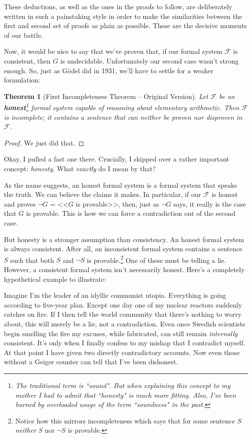 \documentclass{article}
\theoremstyle{theorem}
\newtheorem{theorem}{Theorem}
\begin{document}
These deductions, as well as the ones in the proofs to follow, are deliberately written in such a painstaking style in order to make the similarities between the first and second set of proofs as plain as possible. These are the decisive moments of our battle.

Now, it would be nice to say that we've proven that, if our formal system $\mathcal{F}$ is consistent, then $G$ is undecidable. Unfortunately our second case wasn't strong enough. So, just as Gödel did in 1931, we'll have to settle for a weaker formulation:

\begin{theorem}[First Incompleteness Theorem -- Original Version]
Let $\mathcal{F}$ be an \textbf{honest}\footnote{The traditional term is ``\textit{sound}". But when explaining this concept to my mother I had to admit that ``honesty" is much more fitting. Also, I've been burned by overloaded usage of the term ``soundness" in the past.} formal system capable of reasoning about elementary arithmetic. Then $\mathcal{F}$ is incomplete; it contains a sentence that can neither be proven nor disproven in $\mathcal{F}$.
\end{theorem}

\begin{proof}
We just did that.
\end{proof}

Okay, I pulled a fast one there. Crucially, I skipped over a rather important concept: \textit{honesty}. What \textit{exactly} do I mean by that?

As the name suggests, an honest formal system is a formal system that speaks the truth. We can believe the claims it makes. In particular, if our $\mathcal{F}$ is honest and proves $\neg G$ = <<$G$ is provable>>, then, just as $\neg G$ says, it really is the case that $G$ is provable. This is how we can force a contradiction out of the second case.

But honesty is a stronger assumption than consistency. An honest formal system is always consistent. After all, an inconsistent formal system contains a sentence $S$ such that both $S$ and $\neg S$ is provable.\footnote{Notice how this mirrors incompleteness which says that for some sentence $S$ \textit{neither} $S$ nor $\neg S$ is provable.} One of these must be telling a lie. However, a consistent formal system isn't necessarily honest. Here's a completely hypothetical example to illustrate: 

Imagine I'm the leader of an idyllic communist utopia. Everything is going according to five-year plan. Except one day one of my nuclear reactors suddenly catches on fire. If I then tell the world community that there's nothing to worry about, this will merely be a lie, not a contradiction. Even once Swedish scientists begin smelling the fire my excuses, while fabricated, can still remain \textit{internally} consistent. It's only when I finally confess to my mishap that I contradict myself. At that point I have given two directly contradictory accounts. Now even those without a Geiger counter can tell that I've been dishonest.
\end{document}
